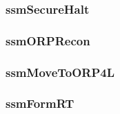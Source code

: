 \documentclass[../../main/main.tex]{subfiles}
\begin{document}
\subsubsection{ssmSecureHalt}\label{sssec:ssmSecureHalt}

\subsubsection{ssmORPRecon}\label{sssec:ssmORPRecon}

\subsubsection{ssmMoveToORP4L}\label{sssec:ssmMoveToORP4L}

\subsubsection{ssmFormRT}\label{sssec:ssmFormRT}
\end{document}
